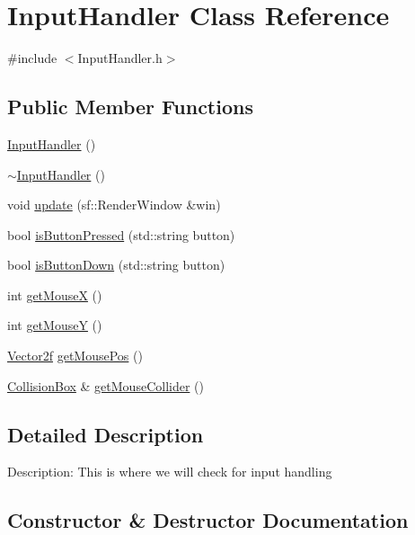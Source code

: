 \hypertarget{class_input_handler}{}\section{Input\+Handler Class Reference}
\label{class_input_handler}


{\ttfamily \#include $<$Input\+Handler.\+h$>$}

\subsection*{Public Member Functions}
\begin{DoxyCompactItemize}
\item 
\mbox{\hyperlink{class_input_handler_a698aa4af4f326a9881835fda251ca996}{Input\+Handler}} ()
\item 
\mbox{\hyperlink{class_input_handler_ac1f7efb54b34d433d6ffba62627452b6}{$\sim$\+Input\+Handler}} ()
\item 
void \mbox{\hyperlink{class_input_handler_a396be11d8d7f45dc3d723bc8096337c1}{update}} (sf\+::\+Render\+Window \&win)
\item 
bool \mbox{\hyperlink{class_input_handler_a526e8fcd0c90911813ed189f4337965d}{is\+Button\+Pressed}} (std\+::string button)
\item 
bool \mbox{\hyperlink{class_input_handler_aacdaae99cc2949e48837d9e6bdb69169}{is\+Button\+Down}} (std\+::string button)
\item 
int \mbox{\hyperlink{class_input_handler_ac44af9b426091829cd5874705cada69f}{get\+MouseX}} ()
\item 
int \mbox{\hyperlink{class_input_handler_a060f7e3712e1361b343eae8c262e0a72}{get\+MouseY}} ()
\item 
\mbox{\hyperlink{class_vector2f}{Vector2f}} \mbox{\hyperlink{class_input_handler_a97d80f9648d4e6a313b7706d790bf7b0}{get\+Mouse\+Pos}} ()
\item 
\mbox{\hyperlink{class_collision_box}{Collision\+Box}} \& \mbox{\hyperlink{class_input_handler_ab3598f14563df47bfaa4573ba2986636}{get\+Mouse\+Collider}} ()
\end{DoxyCompactItemize}


\subsection{Detailed Description}
Description\+: This is where we will check for input handling 

\subsection{Constructor \& Destructor Documentation}
\mbox{\label{class_input_handler_a698aa4af4f326a9881835fda251ca996}} 
